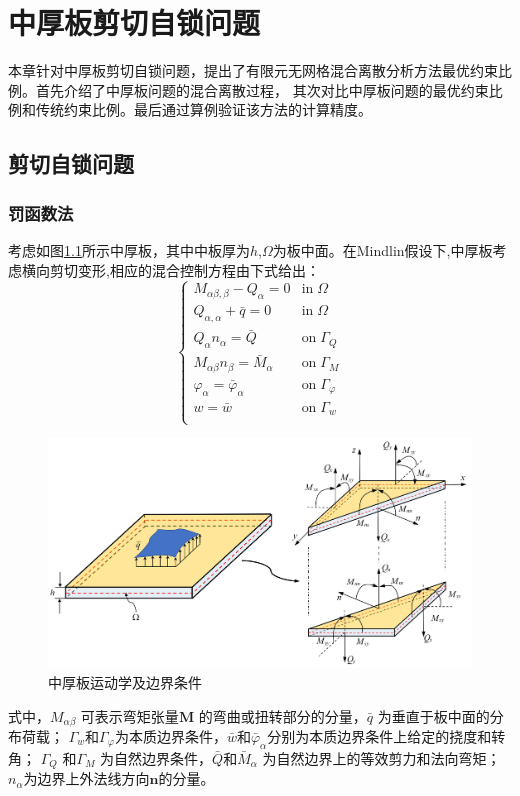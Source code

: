 \chapter{中厚板剪切自锁问题}
本章针对中厚板剪切自锁问题，提出了有限元无网格混合离散分析方法最优约束比例。首先介绍了中厚板问题的混合离散过程，
其次对比中厚板问题的最优约束比例和传统约束比例。最后通过算例验证该方法的计算精度。

\section{剪切自锁问题}    
\subsection{罚函数法}
考虑如图\ref{mindlin_picture}所示中厚板，其中中板厚为$h$,$\Omega$为板中面。在Mindlin假设下,中厚板考虑横向剪切变形,相应的混合控制方程由下式给出：
\begin{equation}\label{strong_mindlin}
    \begin{cases}
        M_{\alpha\beta,\beta} - Q_\alpha = 0 & \textrm{in}\; \Omega \\
        Q_{\alpha,\alpha} + \bar q = 0 & \textrm{in}\; \Omega \\    Q_\alpha n_\alpha = \bar Q & \textrm{on}\; \Gamma_Q \\
        M_{\alpha\beta} n_\beta = \bar M_\alpha & \textrm{on}\; \Gamma_M \\
        \varphi_\alpha = \bar \varphi_\alpha & \textrm{on}\; \Gamma_\varphi \\
        w = \bar w & \textrm{on}\; \Gamma_w \\
    \end{cases}
\end{equation}
\begin{figure}
    \centering 
        \includegraphics[scale=0.5]{figures/shearlocking/Mindlinplate.png}
        \caption{中厚板运动学及边界条件}\label{mindlin_picture}
\end{figure}
式中，$M_{\alpha \beta}$ 可表示弯矩张量$\pmb{M}$ 的弯曲或扭转部分的分量，$\bar{q}$ 为垂直于板中面的分布荷载；
$\Gamma_w$和$\Gamma_\varphi$为本质边界条件，$\bar{w}$和$\bar{\varphi}_\alpha$分别为本质边界条件上给定的挠度和转角；
$\Gamma_Q$ 和$\Gamma_M$ 为自然边界条件，$\bar Q$和$\bar{M}_{\alpha}$ 为自然边界上的等效剪力和法向弯矩；
$n_\alpha$为边界上外法线方向$\pmb{n}$的分量。


